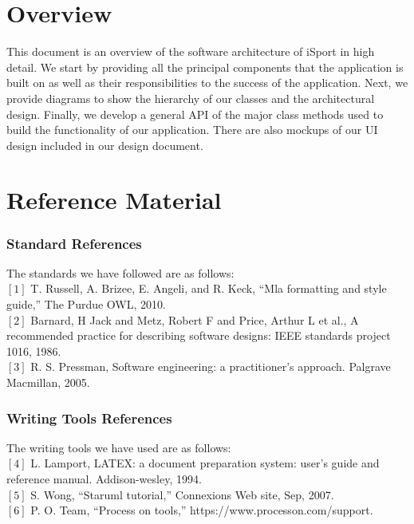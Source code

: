 \documentclass[16pt]{scrreprt}
\begin{document}
\section{Overview}
This document is an overview of the software architecture of iSport in high detail. We start by providing all the principal components that the application is built on as well as their responsibilities to the success of the application. Next, we provide diagrams to show the hierarchy of our classes and the architectural design. Finally, we develop a general API of the major class methods used to build the functionality of our application. There are also mockups of our UI design included in our design document. 

\section{Reference Material}
\subsubsection{Standard References}
The standards we have followed are as follows:\\

$[1]$ T. Russell, A. Brizee, E. Angeli, and R. Keck, “Mla formatting and style guide,” The Purdue OWL, 2010.\\

$[2]$ Barnard, H Jack and Metz, Robert F and Price, Arthur L et al., A recommended practice for describing software designs: IEEE standards project 1016, 1986.\\

$[3]$ R. S. Pressman, Software engineering: a practitioner’s approach. Palgrave Macmillan, 2005.\\

\subsubsection{Writing Tools References}
The writing tools we have used are as follows:\\

$[4]$ L. Lamport, LATEX: a document preparation system: user’s guide and reference manual. Addison-wesley, 1994.\\

$[5]$ S. Wong, “Staruml tutorial,” Connexions Web site, Sep, 2007.\\

$[6]$ P. O. Team, “Process on tools,” https://www.processon.com/support.
\end{document}
